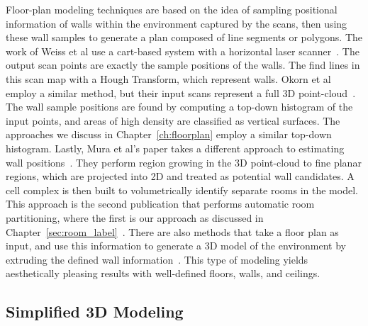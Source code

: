 \documentclass[12pt,onecolumn,oneside]{book}
\begin{document}
Floor-plan modeling techniques are based on the idea of sampling positional information of walls within the environment captured by the scans, then using these wall samples to generate a plan composed of line segments or polygons.  The work of Weiss et al use a cart-based system with a horizontal laser scanner~\cite{Weiss05}.  The output scan points are exactly the sample positions of the walls.  The find lines in this scan map with a Hough Transform, which represent walls.  Okorn et al employ a similar method, but their input scans represent a full 3D point-cloud~\cite{Okorn09}.  The wall sample positions are found by computing a top-down histogram of the input points, and areas of high density are classified as vertical surfaces.  The approaches we discuss in Chapter~\ref{ch:floorplan} employ a similar top-down histogram.  Lastly, Mura et al's paper takes a different approach to estimating wall positions~\cite{Mura13}.  They perform region growing in the 3D point-cloud to fine planar regions, which are projected into 2D and treated as potential wall candidates.  A cell complex is then built to volumetrically identify separate rooms in the model.  This approach is the second publication that performs automatic room partitioning, where the first is our approach as discussed in Chapter~\ref{sec:room_label}~\cite{Turner14}.  There are also methods that take a floor plan as input, and use this information to generate a 3D model of the environment by extruding the defined wall information~\cite{Or05,Lewis98}.  This type of modeling yields aesthetically pleasing results with well-defined floors, walls, and ceilings.

\subsection{Simplified 3D Modeling}
\label{ssec:background_planefit}
\end{document}
